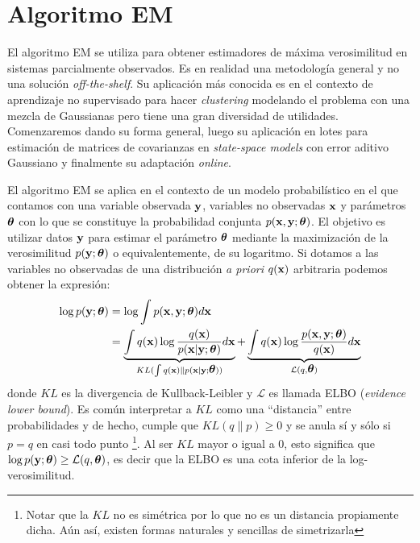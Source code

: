 \section{Algoritmo EM}

El algoritmo EM se utiliza para obtener estimadores de máxima verosimilitud en sistemas parcialmente observados. Es en realidad una metodología general y no una solución \textit{off-the-shelf}. Su aplicación más conocida es en el contexto de aprendizaje no supervisado para hacer \textit{clustering} modelando el problema con una mezcla de Gaussianas \citep{Bishop2006} pero tiene una gran diversidad de utilidades. Comenzaremos dando su forma general, luego su aplicación en lotes para estimación de matrices de covarianzas en \textit{state-space models} con error aditivo Gaussiano y finalmente su adaptación \textit{online}.

El algoritmo EM se aplica en el contexto de un modelo probabilístico en el que contamos con una variable observada $\mathbf{y}$, variables no observadas $\mathbf{x}$ y parámetros $\mbox{\boldmath$ \theta $}$ con lo que se constituye la probabilidad conjunta $p(\mathbf{x},  \mathbf{y}; \mbox{\boldmath$ \theta $})$. El objetivo es utilizar datos $\mathbf{y}$ para estimar el parámetro $\mbox{\boldmath$ \theta $}$ mediante la maximización de la verosimilitud $p(\mathbf{y}; \mbox{\boldmath$ \theta $})$ o equivalentemente, de su logaritmo. Si dotamos a las variables no observadas de una distribución \textit{a priori} $q(\mathbf{x})$ arbitraria podemos obtener la expresión:
\begin{align}
    \log p(\mathbf{y}; \mbox{\boldmath$ \theta $}) &=  \log \int p(\mathbf{x}, \mathbf{y}; \mbox{\boldmath$ \theta $}) d\mathbf{x} \\
    &=  \underbrace{\int q(\mathbf{x}) \log \frac{q(\mathbf{x})}{p(\mathbf{x} | \mathbf{y}; \mbox{\boldmath$ \theta $})} d\mathbf{x}}_{KL(\int q(\mathbf{x}) \rVert p(\mathbf{x} | \mathbf{y}; \mbox{\boldmath$ \theta $}))} + \underbrace{\int q(\mathbf{x}) \log \frac{p(\mathbf{x}, \mathbf{y}; \mbox{\boldmath$ \theta $})}{q(\mathbf{x})} d\mathbf{x}}_{\mathcal{L}(q, \mbox{\boldmath$ \theta $})} \label{eq:elbo_KL}
\end{align}
donde $KL$ es la divergencia de Kullback-Leibler y $\mathcal{L}$ es llamada ELBO (\textit{evidence lower bound}). Es común interpretar a $KL$ como una ``distancia'' entre probabilidades y de hecho, cumple que $KL(q \rVert p) \geq 0$ y se anula sí y sólo si $p = q$ en casi todo punto \footnote{Notar que la $KL$ no es simétrica por lo que no es un distancia propiamente dicha. Aún así, existen formas naturales y sencillas de simetrizarla}. Al ser $KL$ mayor o igual a 0, esto significa que $\log p(\mathbf{y}; \mbox{\boldmath$ \theta $}) \geq \mathcal{L}(q, \mbox{\boldmath$ \theta $})$, es decir que la ELBO es una cota inferior de la log-verosimilitud.  

